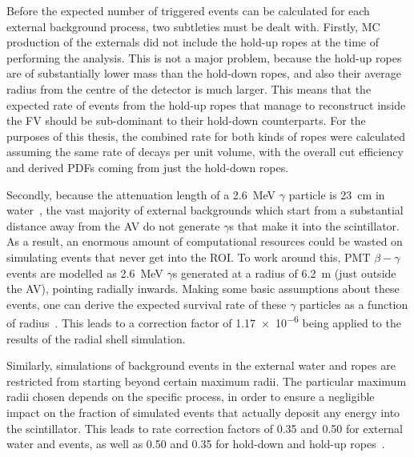 Before the expected number of triggered events can be calculated for each external background process, two subtleties must be dealt with. Firstly, MC production of the externals did not include the hold-up ropes at the time of performing the analysis. This is not a major problem, because the hold-up ropes are of substantially lower mass than the hold-down ropes, and also their average radius from the centre of the detector is much larger. This means that the expected rate of events from the hold-up ropes that manage to reconstruct inside the FV should be sub-dominant to their hold-down counterparts. For the purposes of this thesis, the combined rate for both kinds of ropes were calculated assuming the same rate of decays per unit volume, with the overall cut efficiency and derived PDFs coming from just the hold-down ropes.

Secondly, because the attenuation length of a \SI{2.6}{\MeV} $\gamma$ particle is \SI{23}{\cm} in water~\cite{bergerXCOMPhotonCross2009,heintzelmanSurvivalRadiiPSUP2012}, %
the vast majority of external backgrounds which start from a substantial distance away from the AV do not generate $\gamma$s that make it into the scintillator. As a result, an enormous amount of computational resources could be wasted on simulating events that never get into the ROI. To work around this, PMT $\beta-\gamma$ events are modelled as \SI{2.6}{\MeV} $\gamma$s generated at a radius of \SI{6.2}{\m} (just outside the AV), pointing radially inwards. Making some basic assumptions about these events, one can derive the expected survival rate of these $\gamma$ particles as a function of radius~\cite{heintzelmanSurvivalRadiiPSUP2012,heintzelmanAngularDistributionSurviving2013}. %
This leads to a correction factor of \num{1.17e-6} being applied to the results of the radial shell simulation.

Similarly, simulations of background events in the external water and ropes are restricted from starting beyond certain maximum radii. The particular maximum radii chosen depends on the specific process, in order to ensure a negligible impact on the fraction of simulated events that actually deposit any energy into the scintillator. This leads to rate correction factors of 0.35 and 0.50 for external water  and  events, as well as 0.50 and 0.35 for hold-down and hold-up ropes~\cite{inacioUsingSmallerShell2019}. %
